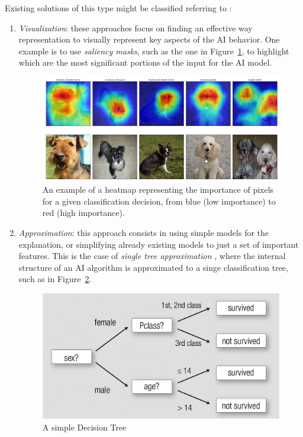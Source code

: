 \documentclass[conference]{IEEEtran}
\newcommand{\cit}[1][]{\todo[tickmarkheight=0.2cm]{cit #1}}
\begin{document}
Existing solutions of this type might be classified referring to \citet{nasaxai}:

\begin{enumerate}
    \item \textit{Visualization}: these approaches focus on finding an effective
          way representation to visually represent key aspects of the AI
          behavior. One example is to use \textit{saliency masks}, such as the
          one in Figure~\ref{fig:heatmap}, to highlight which are the most
          significant portions of the input for the AI model.

          \begin{figure}[h!] \centering \includegraphics[width=0.9\linewidth]{images/dog_localization.png}
              \caption{An example of a heatmap representing the importance of pixels for a given classification decision, from blue (low importance) to red (high importance). } \label{fig:heatmap} \end{figure}

    \item \textit{Approximation}: this approach consists in using simple models for the explanation, or simplifying already existing models to just a set of important features. This is the case of \textit{single tree approximation} \cit, where the internal structure of an AI algorithm is approximated to a singe classification tree, such as in Figure~\ref{fig:dectree}.

          \begin{figure}[ht!] \centering
              \includegraphics[width=0.9\linewidth]{images/dectree} \caption{A simple Decision Tree} \label{fig:dectree} \end{figure}


\end{enumerate}
\end{document}
